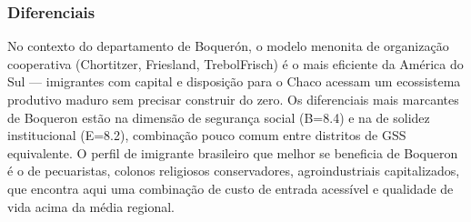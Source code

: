\subsubsection*{Diferenciais}\label{dif-boqueron-1606}
No contexto do departamento de Boquerón, o modelo menonita de organização cooperativa (Chortitzer, Friesland, TrebolFrisch) é o mais eficiente da América do Sul — imigrantes com capital e disposição para o Chaco acessam um ecossistema produtivo maduro sem precisar construir do zero. Os diferenciais mais marcantes de Boqueron estão na dimensão de segurança social (B=8.4) e na de solidez institucional (E=8.2), combinação pouco comum entre distritos de GSS equivalente. O perfil de imigrante brasileiro que melhor se beneficia de Boqueron é o de pecuaristas, colonos religiosos conservadores, agroindustriais capitalizados, que encontra aqui uma combinação de custo de entrada acessível e qualidade de vida acima da média regional.
